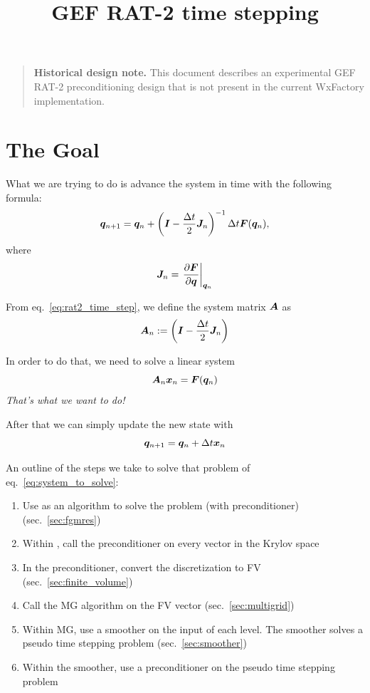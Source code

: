 \documentclass{article}
\title{GEF RAT-2 time stepping}
\begin{document}
\maketitle

\begin{quote}
\textbf{Historical design note.} This document describes an experimental GEF RAT-2
preconditioning design that is not present in the current WxFactory implementation.
\end{quote}

\section{The Goal}

What we are trying to do is advance the system in time with the following formula:
\begin{equation}\label{eq:rat2_time_step}
    \bm{q}_{n+1} = \bm{q}_n + \left( \bm{I} - \dfrac{\Delta t}{2}\bm{J}_{n} \right)^{-1} \Delta t \bm{F}(\bm{q}_{n})
    \text{,}
\end{equation}
where
\begin{equation}
    \bm{J}_n = \left. \dfrac{\partial\bm{F}}{\partial\bm{q}} \right|_{\bm{q}_n}
\end{equation}

From eq.~\ref{eq:rat2_time_step}, we define the system matrix $\bm{A}$ as
\begin{equation}\label{eq:system_mat}
    \bm{A}_n := \left( \bm{I} - \dfrac{\Delta t}{2}\bm{J}_{n} \right)
\end{equation}

In order to do that, we need to solve a linear system
\begin{equation}\label{eq:system_to_solve}
    \bm{A}_n \bm{x}_n = \bm{F}(\bm{q}_{n})
\end{equation}
\emph{That's what we want to do!}

After that we can simply update the new state with
\begin{equation}
    \bm{q}_{n+1} = \bm{q}_n + \Delta t\bm{x}_n
\end{equation}

An outline of the steps we take to solve that problem of eq.~\ref{eq:system_to_solve}:
\begin{enumerate}
    \item Use \fgmres{} as an algorithm to solve the problem (with preconditioner) (sec.~\ref{sec:fgmres})
    \item Within \fgmres, call the preconditioner on every vector in the Krylov space 
    \item In the preconditioner, convert the discretization to FV (sec.~\ref{sec:finite_volume})
    \item Call the MG algorithm on the FV vector (sec.~\ref{sec:multigrid})
    \item Within MG, use a smoother on the input of each level. The smoother solves a pseudo time stepping problem (sec.~\ref{sec:smoother})
    \item Within the smoother, use a preconditioner on the pseudo time stepping problem
\end{enumerate}
\end{document}
